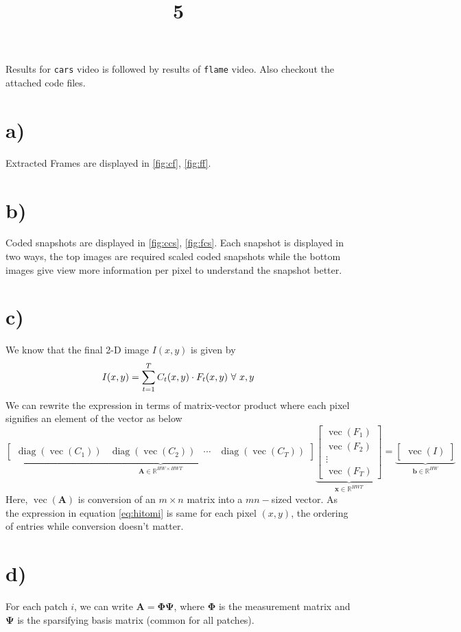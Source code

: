\documentclass[a4paper, landscape]{article}
\title{5}
\date{}
\newcommand{\op}{\operatorname}
\begin{document}
\maketitle
Results for \verb!cars! video is followed by results of \verb!flame! video. Also checkout the attached code files.
\section*{a)}
Extracted Frames are displayed in \ref{fig:cf}, \ref{fig:ff}.
\section*{b)}
Coded snapshots are displayed in \ref{fig:ccs}, \ref{fig:fcs}. Each snapshot is displayed in two ways, the top images are required scaled coded snapshots while the bottom images give view more information per pixel to understand the snapshot better.
\section*{c)}
We know that the final 2-D image $I(x,y)$ is given by
\begin{equation}{\label{eq:hitomi}}
I(x,y) = \sum_{t=1}^T C_t(x,y)\cdot F_t(x,y)\ \forall\ x,y
\end{equation}
We can rewrite the expression in terms of matrix-vector product where each pixel signifies an element of the vector as below
\begin{equation}
\underbrace{
	\begin{bmatrix}
	\op{diag}(\op{vec}(C_1)) & \op{diag}(\op{vec}(C_2)) & \cdots & \op{diag}(\op{vec}(C_T))
	\end{bmatrix}
}_{\bm{A}\in\mathbb{R}^{HW\times HWT}}
\underbrace{
	\begin{bmatrix}
	\op{vec}(F_1) \\ \op{vec}(F_2) \\ \vdots \\ \op{vec}(F_T)
	\end{bmatrix}
}_{\bm{x}\in\mathbb{R}^{HWT}}
=
\underbrace{
	\begin{bmatrix}
	\op{vec}(I)
	\end{bmatrix}
}_{\bm{b}\in\mathbb{R}^{HW}}
\end{equation}
Here, $\op{vec}(\bm{A})$ is conversion of an $m\times n$ matrix into a $mn-$sized vector. As the expression in equation \ref{eq:hitomi} is same for each pixel $(x,y)$, the ordering of entries while conversion doesn't matter.
\section*{d)}
For each patch $i$, we can write $\bm{A}=\bm{\Phi}\bm{\Psi}$, where $\bm{\Phi}$ is the measurement matrix and $\bm{\Psi}$ is the sparsifying basis matrix (common for all patches).
\end{document}
